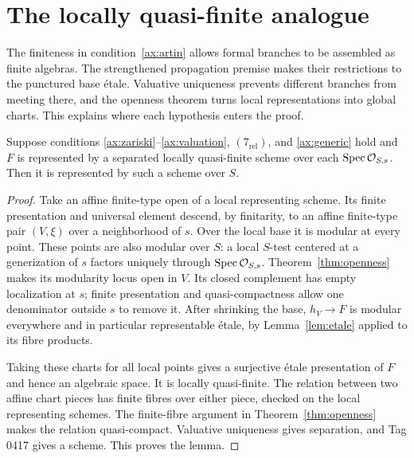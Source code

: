 \section{The locally quasi-finite analogue}\label{sec:criterion}



The finiteness in condition~\ref{ax:artin} allows formal branches to be assembled as finite algebras. The strengthened propagation premise makes their restrictions to the punctured base \'etale. Valuative uniqueness prevents different branches from meeting there, and the openness theorem turns local representations into global charts. This explains where each hypothesis enters the proof.

\begin{lemma}\label{lem:local-global}
Suppose conditions \ref{ax:zariski}--\ref{ax:valuation}, $(7_{\mathrm{rel}})$, and \ref{ax:generic} hold and $F$ is represented by a separated locally quasi-finite scheme over each $\operatorname{Spec}\mathcal O_{S,s}$. Then it is represented by such a scheme over $S$.
\end{lemma}
\begin{proof}
Take an affine finite-type open of a local representing scheme. Its finite presentation and universal element descend, by finitarity, to an affine finite-type pair $(V,\xi)$ over a neighborhood of $s$. Over the local base it is modular at every point. These points are also modular over $S$: a local $S$-test centered at a generization of $s$ factors uniquely through $\operatorname{Spec}\mathcal O_{S,s}$. Theorem~\ref{thm:openness} makes its modularity locus open in $V$. Its closed complement has empty localization at $s$; finite presentation and quasi-compactness allow one denominator outside $s$ to remove it. After shrinking the base, $h_V\to F$ is modular everywhere and in particular representable \'etale, by Lemma~\ref{lem:etale} applied to its fibre products.

Taking these charts for all local points gives a surjective \'etale presentation of $F$ and hence an algebraic space. It is locally quasi-finite. The relation between two affine chart pieces has finite fibres over either piece, checked on the local representing schemes. The finite-fibre argument in Theorem~\ref{thm:openness} makes the relation quasi-compact. Valuative uniqueness gives separation, and Tag 0417 gives a scheme. This proves the lemma.
\end{proof}

